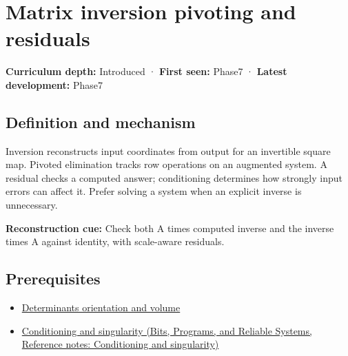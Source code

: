 \hypertarget{appendix-48d2e66378ab}{}\label{referencestart:appendix-48d2e66378ab}
\section{Matrix inversion pivoting and residuals}\label{appendix-48d2e66378ab-matrix-inversion-pivoting-and-residuals}

\hypertarget{appendix-48d2e66378ab-matrix-inversion-pivoting-and-residuals}{}

\textbf{Curriculum depth:} Introduced · \textbf{First seen:} Phase7 · \textbf{Latest development:} Phase7

\begin{allmightroledefinition}

\subsection{Definition and mechanism}\label{appendix-48d2e66378ab-definition-and-mechanism}

\hypertarget{appendix-48d2e66378ab-definition-and-mechanism}{}

Inversion reconstructs input coordinates from output for an invertible square map. Pivoted elimination tracks row operations on an augmented system. A residual checks a computed answer; conditioning determines how strongly input errors can affect it. Prefer solving a system when an explicit inverse is unnecessary.

\end{allmightroledefinition}

\textbf{Reconstruction cue:} Check both A times computed inverse and the inverse times A against identity, with scale-aware residuals.

\subsection{Prerequisites}\label{appendix-48d2e66378ab-prerequisites}

\hypertarget{appendix-48d2e66378ab-prerequisites}{}

\begin{itemize}
\tightlist
\item
  \hyperref[appendix-da478be01d02]{Determinants orientation and volume}
\item
  \href{../01-Bits-Programs-and-Reliable-Systems/main.pdf\#nameddest=appendix-8f6a01f284a7}{Conditioning and singularity (Bits, Programs, and Reliable Systems, Reference notes: Conditioning and singularity)}
\end{itemize}

